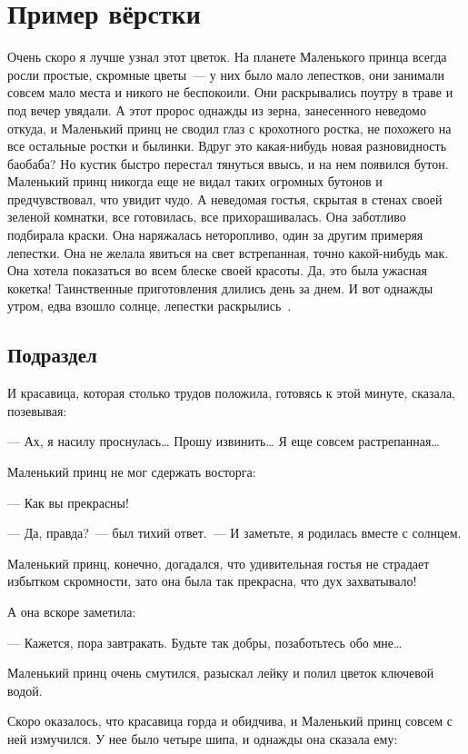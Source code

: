 \documentclass[14pt, a4paper, titlepage]{extarticle}
\begin{document}
\section{Пример вёрстки}

Очень скоро я лучше узнал этот цветок. На планете Маленького принца всегда росли простые, скромные цветы~--- у них было мало лепестков, они занимали совсем мало места и никого не беспокоили. Они раскрывались поутру в траве и под вечер увядали. А этот пророс однажды из зерна, занесенного неведомо откуда, и Маленький принц не сводил глаз с крохотного ростка, не похожего на все остальные ростки и былинки. Вдруг это какая-нибудь новая разновидность баобаба? Но кустик быстро перестал тянуться ввысь, и на нем появился бутон. Маленький принц никогда еще не видал таких огромных бутонов и предчувствовал, что увидит чудо. А неведомая гостья, скрытая в стенах своей зеленой комнатки, все готовилась, все прихорашивалась. Она заботливо подбирала краски. Она наряжалась неторопливо, один за другим примеряя лепестки. Она не желала явиться на свет встрепанная, точно какой-нибудь мак. Она хотела показаться во всем блеске своей красоты. Да, это была ужасная кокетка! Таинственные приготовления длились день за днем. И вот однажды утром, едва взошло солнце, лепестки раскрылись~\cite{bib:prince}.

\subsection{Подраздел}

И красавица, которая столько трудов положила, готовясь к этой минуте, сказала, позевывая:

--- Ах, я насилу проснулась\dots{} Прошу извинить\dots{} Я еще совсем растрепанная\dots{}

Маленький принц не мог сдержать восторга:

--- Как вы прекрасны!

--- Да, правда?~--- был тихий ответ.~--- И заметьте, я родилась вместе с солнцем.

Маленький принц, конечно, догадался, что удивительная гостья не страдает избытком скромности, зато она была так прекрасна, что дух захватывало!

А она вскоре заметила:

--- Кажется, пора завтракать. Будьте так добры, позаботьтесь обо мне\dots{}

Маленький принц очень смутился, разыскал лейку и полил цветок ключевой водой.

Скоро оказалось, что красавица горда и обидчива, и Маленький принц совсем с ней измучился. У нее было четыре шипа, и однажды она сказала ему:
\end{document}
